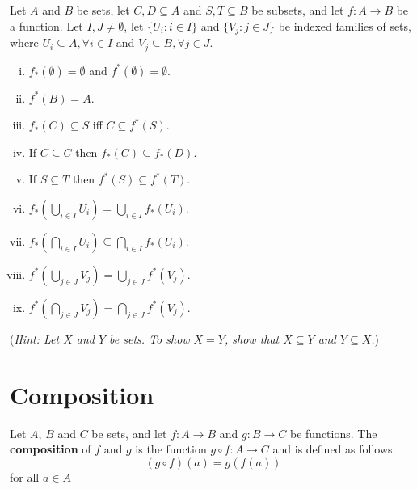\documentclass[a4paper,english,12pt]{article}
\begin{document}
\begin{thm} Let $A$ and $B$ be sets, let $C,D\subseteq A$ and $S,T\subseteq B$ be subsets, and let $f:A\rightarrow B$ be a function. Let $I,J\neq\emptyset$, let $\{U_i:i\in I\}$ and $\{V_j:j\in J\}$ be indexed families of sets, where $U_i\subseteq A, \forall i\in I$ and $V_j\subseteq B, \forall j\in J$.
\begin{multicols}{2}
\begin{enumerate}[i)]
\item $f_*(\emptyset)=\emptyset$ and $f^*(\emptyset)=\emptyset$.
\item $f^*(B)=A$.
\item $f_*(C)\subseteq S$ iff $C\subseteq f^*(S)$.
\item If $C\subseteq C$ then $f_*(C)\subseteq f_*(D)$.
\item If $S\subseteq T$ then $f^*(S)\subseteq f^*(T)$.
\item $f_*(\bigcup_{i\in I}U_i)=\bigcup_{i\in I}f_*(U_i)$.
\item $f_*(\bigcap_{i\in I}U_i)\subseteq \bigcap_{i\in I}f_*(U_i)$.
\item $f^*(\bigcup_{j\in J}V_j)=\bigcup_{j\in J}f^*(V_j)$.
\item $f^*(\bigcap_{j\in J}V_j)=\bigcap_{j\in J}f^*(V_j)$.
\end{enumerate} 
\end{multicols}
\label{img-preimg_props}
\end{thm}
\noindent (\textit{Hint: Let $X$ and $Y$ be sets. To show $X=Y$, show that $X\subseteq Y$ and $Y\subseteq X$.})

\section{Composition}
\begin{defn} Let $A$, $B$ and $C$ be sets, and let $f:A\rightarrow B$ and $g:B\rightarrow C$ be functions. The \textbf{composition} of $f$ and $g$ is the function $g\circ f:A\rightarrow C$ and is defined as follows:
\begin{equation*}
(g\circ f) (a)  =g(f(a))
\end{equation*}
for all $a\in A$
\end{defn}
\end{document}

